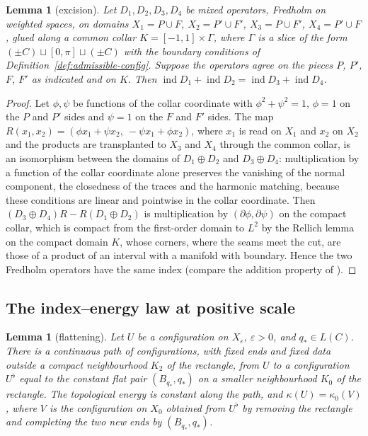 \documentclass[11pt]{amsart}
\newtheorem{lemma}[theorem]{Lemma}
\theoremstyle{definition}
\theoremstyle{remark}
\theoremstyle{plain}
\numberwithin{equation}{section}
\newcommand{\ind}{\operatorname{ind}}
\newcommand{\eps}{\varepsilon}
\begin{document}
\begin{lemma}[excision]\label{lem:excision}
Let $D_1,D_2,D_3,D_4$ be mixed operators, Fredholm on weighted spaces, on
domains $X_1=P\cup F$, $X_2=P'\cup F'$, $X_3=P\cup F'$, $X_4=P'\cup F$,
glued along a common collar $K=[-1,1]\times\Gamma$, where $\Gamma$ is a
slice of the form $(\pm C)\sqcup[0,\pi]\sqcup(\pm C)$ with the boundary
conditions of Definition~\ref{def:admissible-config}. Suppose the
operators agree on the pieces $P$, $P'$, $F$, $F'$ as indicated and on
$K$. Then $\ind D_1+\ind D_2=\ind D_3+\ind D_4$.
\end{lemma}

\begin{proof}
Let $\phi,\psi$ be functions of the collar coordinate with
$\phi^2+\psi^2=1$, $\phi=1$ on the $P$ and $P'$ sides and $\psi=1$ on the
$F$ and $F'$ sides. The map
$R(x_1,x_2)=(\phi x_1+\psi x_2,\ -\psi x_1+\phi x_2)$, where $x_1$ is read
on $X_1$ and $x_2$ on $X_2$ and the products are transplanted to $X_3$ and
$X_4$ through the common collar, is an isomorphism between the domains of
$D_1\oplus D_2$ and $D_3\oplus D_4$: multiplication by a function of the
collar coordinate alone preserves the vanishing of the normal component,
the closedness of the traces and the harmonic matching, because these
conditions are linear and pointwise in the collar coordinate. Then
$(D_3\oplus D_4)R-R(D_1\oplus D_2)$ is multiplication by
$(\partial\phi,\partial\psi)$ on the compact collar, which is compact from
the first-order domain to $L^2$ by the Rellich lemma on the compact
domain $K$, whose corners, where the seams meet the cut, are those of a
product of an interval with a manifold with boundary. Hence the two
Fredholm operators have the same index (compare the addition property of \cite[Section~3.3]{Donaldson-book}).
\end{proof}

\subsection{The index--energy law at positive scale}\label{subsec:index-law}

\begin{lemma}[flattening]\label{lem:flattening}
Let $U$ be a configuration on $X_\eps$, $\eps>0$, and
$q_*\in L(C)$. There is a continuous path of configurations,
with fixed ends and fixed data outside a compact neighbourhood $K_2$ of
the rectangle, from $U$ to a configuration $U^\flat$ equal to the constant
flat pair $(B_{q_*},q_*)$ on a smaller neighbourhood $K_0$ of the
rectangle. The topological energy is constant along the path, and
$\kappa(U)=\kappa_0(V)$, where $V$ is the configuration on $X_0$ obtained
from $U^\flat$ by removing the rectangle and completing the two new ends by
$(B_{q_*},q_*)$.
\end{lemma}
\end{document}
